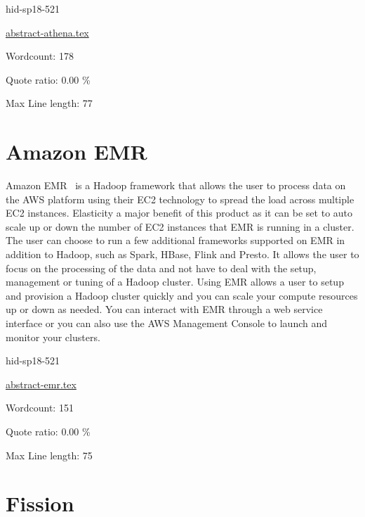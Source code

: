 \begin{IU}

hid-sp18-521

\href{https://github.com/cloudmesh-community/hid-sp18-521/blob/master//technology/abstract-athena.tex}{abstract-athena.tex}

 

Wordcount: 178


Quote ratio: 0.00 \%
 
Max Line length: 77
\end{IU}

\section{Amazon EMR}

Amazon EMR~\cite{hid-sp18-521-AmazonEMR} is a Hadoop framework that allows
the user to process data on the AWS platform using their EC2 technology to
spread the load across multiple EC2 instances. Elasticity a major benefit
of this product as it can be set to auto scale up or down the number of
EC2 instances that EMR is running in a cluster. The user can choose to run 
a few additional frameworks supported on EMR in addition to Hadoop,
such as Spark, HBase, Flink and Presto. It allows the user to focus on the
processing of the data and not have to deal with the setup, management or
tuning of a Hadoop cluster. Using EMR allows a user to setup and provision
a Hadoop cluster quickly and you can scale your compute resources up or
down as needed. You can interact with EMR through a web service interface
or you can also use the AWS Management Console to launch and monitor your
clusters.


\begin{IU}

hid-sp18-521

\href{https://github.com/cloudmesh-community/hid-sp18-521/blob/master//technology/abstract-emr.tex}{abstract-emr.tex}

 

Wordcount: 151


Quote ratio: 0.00 \%
 
Max Line length: 75
\end{IU}

\section{Fission}

